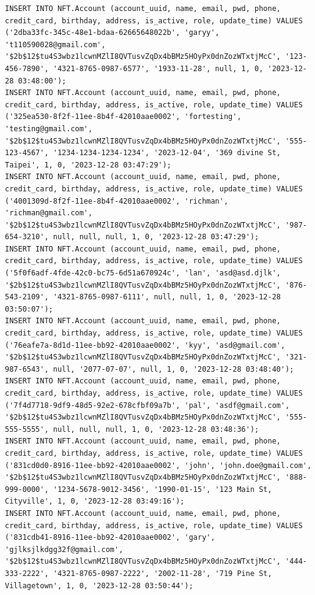 \documentclass[a4paper, 12pt]{article}
\begin{document}
\begin{lstlisting}
INSERT INTO NFT.Account (account_uuid, name, email, pwd, phone, credit_card, birthday, address, is_active, role, update_time) VALUES ('2dba33fc-345c-48e1-bdaa-62665648022b', 'garyy', 't110590028@gmail.com', '$2b$12$tu4S3wbz1lcwnMZlI8QVTusvZqDx4bBMz5HOyPx0dnZozWTxtjMcC', '123-456-7890', '4321-8765-0987-6577', '1933-11-28', null, 1, 0, '2023-12-28 03:48:00');
INSERT INTO NFT.Account (account_uuid, name, email, pwd, phone, credit_card, birthday, address, is_active, role, update_time) VALUES ('325ea530-8f2f-11ee-8b4f-42010aae0002', 'fortesting', 'testing@gmail.com', '$2b$12$tu4S3wbz1lcwnMZlI8QVTusvZqDx4bBMz5HOyPx0dnZozWTxtjMcC', '555-123-4567', '1234-1234-1234-1234', '2023-12-04', '369 divine St, Taipei', 1, 0, '2023-12-28 03:47:29');
INSERT INTO NFT.Account (account_uuid, name, email, pwd, phone, credit_card, birthday, address, is_active, role, update_time) VALUES ('4001309d-8f2f-11ee-8b4f-42010aae0002', 'richman', 'richman@gmail.com', '$2b$12$tu4S3wbz1lcwnMZlI8QVTusvZqDx4bBMz5HOyPx0dnZozWTxtjMcC', '987-654-3210', null, null, null, 1, 0, '2023-12-28 03:47:29');
INSERT INTO NFT.Account (account_uuid, name, email, pwd, phone, credit_card, birthday, address, is_active, role, update_time) VALUES ('5f0f6adf-4fde-42c0-bc75-6d51a670924c', 'lan', 'asd@asd.djlk', '$2b$12$tu4S3wbz1lcwnMZlI8QVTusvZqDx4bBMz5HOyPx0dnZozWTxtjMcC', '876-543-2109', '4321-8765-0987-6111', null, null, 1, 0, '2023-12-28 03:50:07');
INSERT INTO NFT.Account (account_uuid, name, email, pwd, phone, credit_card, birthday, address, is_active, role, update_time) VALUES ('76eafe7a-8d1d-11ee-bb92-42010aae0002', 'kyy', 'asd@gmail.com', '$2b$12$tu4S3wbz1lcwnMZlI8QVTusvZqDx4bBMz5HOyPx0dnZozWTxtjMcC', '321-987-6543', null, '2077-07-07', null, 1, 0, '2023-12-28 03:48:40');
INSERT INTO NFT.Account (account_uuid, name, email, pwd, phone, credit_card, birthday, address, is_active, role, update_time) VALUES ('7f4d7718-9df9-48d5-92e2-678cfbf09a7b', 'pal', 'asdf@gmail.com', '$2b$12$tu4S3wbz1lcwnMZlI8QVTusvZqDx4bBMz5HOyPx0dnZozWTxtjMcC', '555-555-5555', null, null, null, 1, 0, '2023-12-28 03:48:36');
INSERT INTO NFT.Account (account_uuid, name, email, pwd, phone, credit_card, birthday, address, is_active, role, update_time) VALUES ('831cd0d0-8916-11ee-bb92-42010aae0002', 'john', 'john.doe@gmail.com', '$2b$12$tu4S3wbz1lcwnMZlI8QVTusvZqDx4bBMz5HOyPx0dnZozWTxtjMcC', '888-999-0000', '1234-5678-9012-3456', '1990-01-15', '123 Main St, Cityville', 1, 0, '2023-12-28 03:49:16');
INSERT INTO NFT.Account (account_uuid, name, email, pwd, phone, credit_card, birthday, address, is_active, role, update_time) VALUES ('831cdb41-8916-11ee-bb92-42010aae0002', 'gary', 'gjlksjlkdgg32f@gmail.com', '$2b$12$tu4S3wbz1lcwnMZlI8QVTusvZqDx4bBMz5HOyPx0dnZozWTxtjMcC', '444-333-2222', '4321-8765-0987-2222', '2002-11-28', '719 Pine St, Villagetown', 1, 0, '2023-12-28 03:50:44');

\end{lstlisting}
\end{document}
